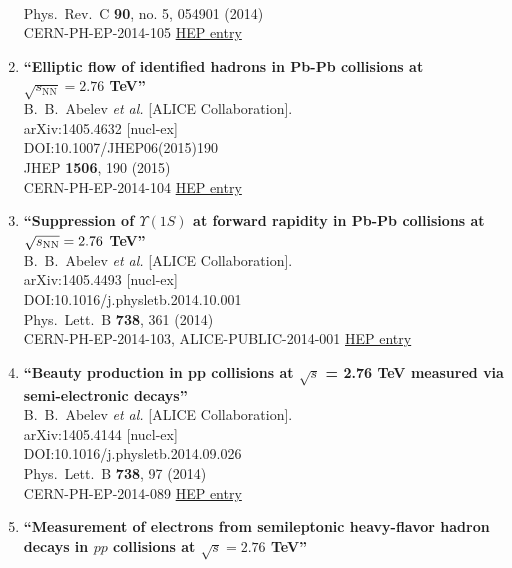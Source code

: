 \begin{enumerate}
  \\{}Phys.\ Rev.\ C {\bf 90}, no. 5, 054901 (2014)
  \\{}CERN-PH-EP-2014-105
\href{http://inspirehep.net/record/1300038}{HEP entry}
\item%
{\bf ``Elliptic flow of identified hadrons in Pb-Pb collisions at $ \sqrt{s_{\mathrm{NN}}}=2.76 $ TeV''}
  \\{}B.~B.~Abelev {\it et al.} [ALICE Collaboration].
  \\{}arXiv:1405.4632 [nucl-ex]
  \\{}DOI:10.1007/JHEP06(2015)190
  \\{}JHEP {\bf 1506}, 190 (2015)
  \\{}CERN-PH-EP-2014-104
\href{http://inspirehep.net/record/1297103}{HEP entry}
\item%
{\bf ``Suppression of $\Upsilon (1S)$ at forward rapidity in Pb-Pb collisions at $\sqrt{s_{\rm NN}} = 2.76$ TeV''}
  \\{}B.~B.~Abelev {\it et al.} [ALICE Collaboration].
  \\{}arXiv:1405.4493 [nucl-ex]
  \\{}DOI:10.1016/j.physletb.2014.10.001
  \\{}Phys.\ Lett.\ B {\bf 738}, 361 (2014)
  \\{}CERN-PH-EP-2014-103, ALICE-PUBLIC-2014-001
\href{http://inspirehep.net/record/1297101}{HEP entry}
\item%
{\bf ``Beauty production in pp collisions at $\sqrt{s}$ = 2.76 TeV measured via semi-electronic decays''}
  \\{}B.~B.~Abelev {\it et al.} [ALICE Collaboration].
  \\{}arXiv:1405.4144 [nucl-ex]
  \\{}DOI:10.1016/j.physletb.2014.09.026
  \\{}Phys.\ Lett.\ B {\bf 738}, 97 (2014)
  \\{}CERN-PH-EP-2014-089
\href{http://inspirehep.net/record/1296861}{HEP entry}
\item%
{\bf ``Measurement of electrons from semileptonic heavy-flavor hadron decays in $pp$ collisions at $\sqrt{s} = 2.76$ TeV''}

\end{enumerate}
